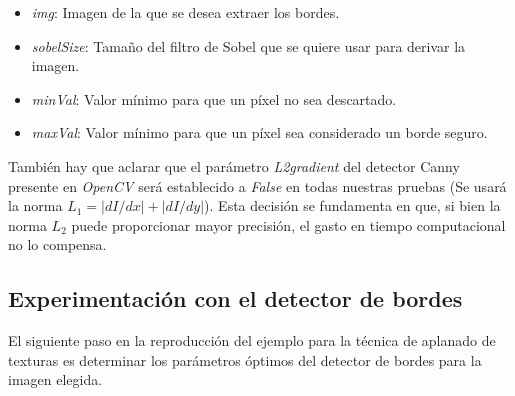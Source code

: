 \documentclass[11pt,twoside,titlepage,a4paper]{article}
\numberwithin{equation}{section} %
\theoremstyle{usual}
\begin{document}
\begin{itemize}
    \item \textit{img}: Imagen de la que se desea extraer los bordes.
    \item \textit{sobelSize}: Tamaño del filtro de Sobel que se quiere usar para derivar la imagen.
    \item \textit{minVal}: Valor mínimo para que un píxel no sea descartado.
    \item \textit{maxVal}: Valor mínimo para que un píxel sea considerado un borde seguro.
\end{itemize}

También hay que aclarar que el parámetro \textit{L2gradient} del detector Canny presente en \textit{OpenCV} será establecido a \textit{False} en todas nuestras pruebas (Se usará la norma $L_1 = 
|dI/dx| + |dI/dy|$). Esta decisión se fundamenta en que, si bien la norma $L_2$ puede proporcionar mayor precisión, el gasto en tiempo computacional no lo compensa.

\subsection{Experimentación con el detector de bordes}

El siguiente paso en la reproducción del ejemplo para la técnica de aplanado de texturas es determinar los parámetros óptimos del detector de bordes para la imagen elegida.
\end{document}
